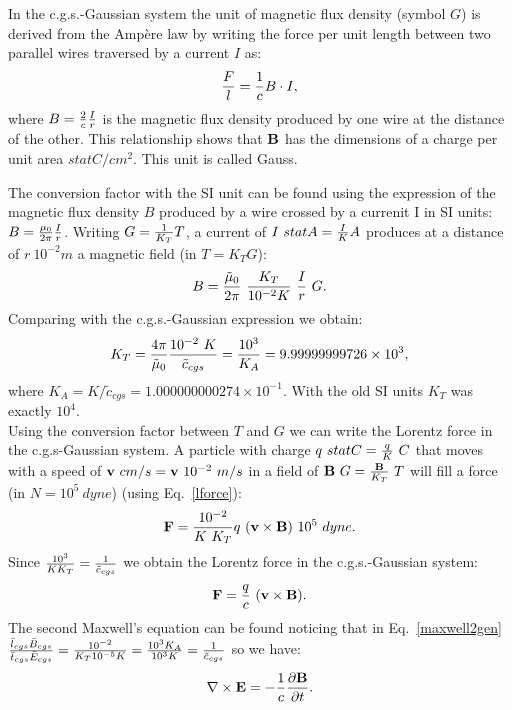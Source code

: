 \documentclass[12pt,a4paper]{article}
\def\kappaa{1.000000000274\times 10^{-1}}
\def\toverg{9.99999999726\times 10^{3}}
\begin{document}
{\color{orange} In the c.g.s.-Gaussian system the unit of magnetic
flux density (symbol $G$) is derived from the Amp\`ere law by writing 
the force per unit length between two parallel wires traversed by 
a current $I$ as:
\begin{equation}
{F \over l} = {1\over c} B \cdot I,
\end{equation}
where $B={2\over c} {I \over r}$ is the magnetic flux density produced by 
one wire at the distance of the other. 
This relationship shows that ${\bf B}$ has the dimensions of a
charge per unit area $statC/cm^2$. This unit is called Gauss.

The conversion factor with the SI unit can be found using the expression of 
the magnetic flux density $B$ produced by a wire crossed by 
a currenit I in SI units: $B={\mu_0\over 2 \pi} {I \over r}$. 
Writing $G={1\over K_T} T$, a current of $I\ statA= {I\over K} 
A$ produces at a distance of $r\ {10^{-2}} m$ a magnetic field 
(in $T=K_T G$): 
\begin{equation}
B={\tilde \mu_0\over 2 \pi}\ {K_T \over
10^{-2} K}\ {I\over r}\  G.
\end{equation}
Comparing with the c.g.s.-Gaussian expression we obtain:
\begin{equation}
K_T= {4 \pi \over \tilde \mu_0} {10^{-2}\ K \over \tilde c_{cgs}}= 
{10^3 \over K_A}=\toverg,
\end{equation}
where $K_A=K/\tilde c_{cgs}=\kappaa$. 
With the old SI units $K_T$ was exactly $10^4$.
\\
Using the conversion factor between $T$ and $G$ we can write the 
Lorentz force in the c.g.s-Gaussian system. A particle with charge
$q\ statC={q\over K}\ C$ that moves with a speed of ${\bf v}\ cm/s=
{\bf v}\ 10^{-2}\ m/s$ in a field of ${\bf B}\ G = {{\bf B} \over K_T}\ T$ 
will fill a force (in $N=10^5\ dyne$) (using Eq.~\ref{lforce}):
\begin{equation}
{\bf F}={10^{-2} \over K\ K_T} q\ ({\bf v}\times {\bf B})\ 10^5\ dyne. 
\end{equation}
Since ${10^{3} \over K K_T}=
{1\over \tilde c_{cgs}}$ we obtain the Lorentz force in the 
c.g.s.-Gaussian system:
\begin{equation}
{\bf F}={q\over c}\ ({\bf v}\times {\bf B}).
\end{equation}
The second Maxwell's equation can be found noticing that 
in Eq.~\ref{maxwell2gen}
${\bar l_{cgs} \bar B_{cgs} \over \bar t_{cgs} \bar E_{cgs}}=
{10^{-2} \over K_T 10^{-5} K}={10^3 K_A \over 10^3 K}={1\over 
\tilde c_{cgs}}$ so we have:
\begin{equation}
\nabla \times {\bf E}=-{1\over c}
{\partial {\bf B} \over \partial t}.
\label{maxwell2cgs}
\end{equation}
}
\\
\end{document}
